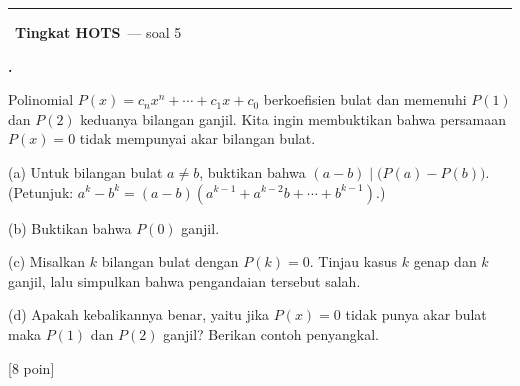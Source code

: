 \documentclass[a4paper,11pt]{article}
\newcounter{no}
\newcommand{\tingkat}[2]{\par\Needspace{7\baselineskip}\vspace{0.6em}\noindent
  {\color{pinkx}\rule{3pt}{1.1em}}\ {\color{redx}\bfseries #1}\ {\small\color{gray}--- #2}\par\vspace{0.1em}}
\newcommand{\soal}[2]{\par\vspace{0.75em}\stepcounter{no}\noindent
  \begin{minipage}[t]{1.8em}\textbf{\theno.}\end{minipage}%
  \begin{minipage}[t]{\dimexpr\linewidth-1.8em\relax}#1\par\vspace{0.35em}#2\end{minipage}\par}
\newcommand{\poin}[1]{\hfill{\small\color{redx}[#1 poin]}}
\begin{document}
\tingkat{Tingkat HOTS}{soal 5}
\soal{Polinomial $P(x)=c_nx^n+\cdots+c_1x+c_0$ berkoefisien bulat dan memenuhi $P(1)$ dan $P(2)$ keduanya bilangan ganjil. Kita ingin membuktikan bahwa persamaan $P(x)=0$ tidak mempunyai akar bilangan bulat.\par\smallskip
(a) Untuk bilangan bulat $a\neq b$, buktikan bahwa $(a-b)\mid\big(P(a)-P(b)\big)$. (Petunjuk: $a^k-b^k=(a-b)(a^{k-1}+a^{k-2}b+\cdots+b^{k-1})$.)\par
(b) Buktikan bahwa $P(0)$ ganjil.\par
(c) Misalkan $k$ bilangan bulat dengan $P(k)=0$. Tinjau kasus $k$ genap dan $k$ ganjil, lalu simpulkan bahwa pengandaian tersebut salah.\par
(d) Apakah kebalikannya benar, yaitu jika $P(x)=0$ tidak punya akar bulat maka $P(1)$ dan $P(2)$ ganjil? Berikan contoh penyangkal.}{\poin{8}}
\end{document}
